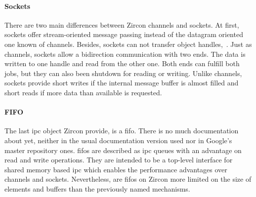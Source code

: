 %
%
%
%
%

\paragraph{Sockets}
There are two main differences between Zircon channels and sockets.
At first, sockets offer stream-oriented message passing instead of the datagram oriented one known of channels.
Besides, sockets can not transfer object handles\cite{zircon-concepts},~\cite{zircon-socket}.
Just as channels, sockets allow a bidirection communication with two ends.
The data is written to one handle and read from the other one. 
Both ends can fulfill both jobs, but they can also been shutdown for reading or writing\cite{zircon-socket}.
Unlike channels, sockets provide short writes if the internal message buffer is almost filled and short reads if more data than available is requested\cite{zircon-concepts}.

%
%
%

\paragraph{FIFO}
The last \ac{ipc} object Zircon provide, is a \ac{fifo}.
There is no much documentation about yet, neither in the usual documentation version used nor in Google's master repository ones.
\acp{fifo} are described as \ac{ipc} queues with an advantage on read and write operations.
They are intended to be a top-level interface for shared memory based \ac{ipc} which enables the performance advantages over channels and sockets.
Nevertheless, are \acp{fifo} on Zircon more limited on the size of elements and buffers than the previously named mechanisms\cite{zircon-fifo}.

